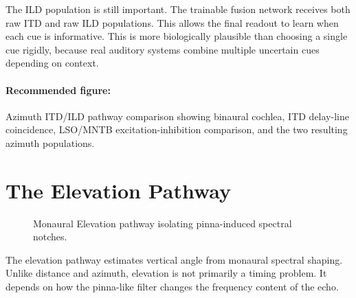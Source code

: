 The ILD population is still important. The trainable fusion network receives both raw ITD and raw ILD populations. This allows the final readout to learn when each cue is informative. This is more biologically plausible than choosing a single cue rigidly, because real auditory systems combine multiple uncertain cues depending on context.

\paragraph{Recommended figure:} Azimuth ITD/ILD pathway comparison showing binaural cochlea, ITD delay-line coincidence, LSO/MNTB excitation-inhibition comparison, and the two resulting azimuth populations.

\section{The Elevation Pathway}

\begin{figure}[htbp]
    \centering
    \caption{Monaural Elevation pathway isolating pinna-induced spectral notches.}
    \label{fig:elevation_flowchart}
\end{figure}

The elevation pathway estimates vertical angle from monaural spectral shaping. Unlike distance and azimuth, elevation is not primarily a timing problem. It depends on how the pinna-like filter changes the frequency content of the echo.

